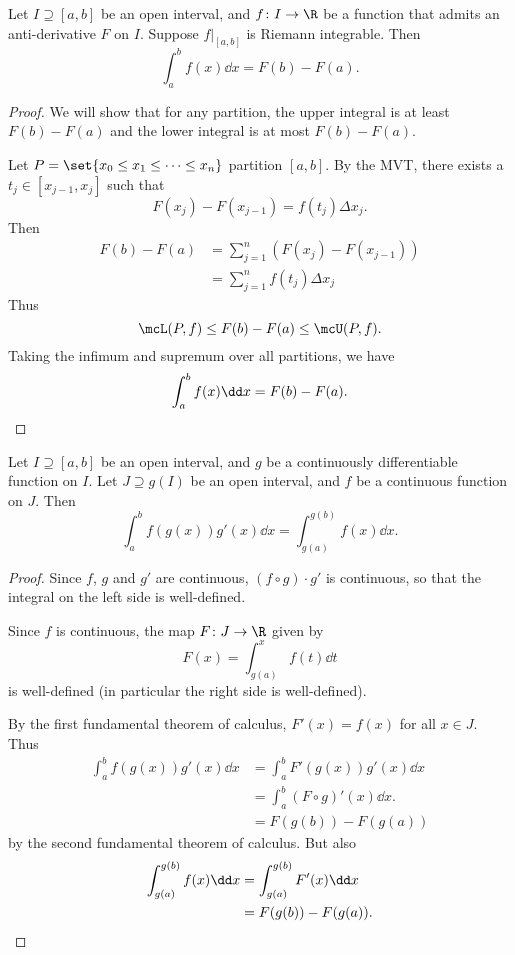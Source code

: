 \begin{exercise*}
    Let $I \supseteq [a, b]$ be an open interval, and
    $f\colon I \to \R$ be a function that admits an anti-derivative $F$
    on $I$.
    Suppose $f\vert_{[a, b]}$ is Riemann integrable.
    Then \[
        \int_a^b f(x) \dd x = F(b) - F(a).
    \]
\end{exercise*}
\begin{proof}
    We will show that for any partition, the upper integral is at least
    $F(b) - F(a)$ and the lower integral is at most $F(b) - F(a)$.

    Let $P = \set{x_0 \le x_1 \le \dots \le x_n}$ partition $[a, b]$.
    By the MVT, there exists a $t_j \in [x_{j-1}, x_j]$ such that \[
        F(x_j) - F(x_{j-1}) = f(t_j) \Delta x_j.
    \] Then \begin{align*}
        F(b) - F(a)
            &= \sum_{j=1}^n (F(x_j) - F(x_{j-1})) \\
            &= \sum_{j=1}^n f(t_j) \Delta x_j
    \end{align*}
    Thus \[
        \mcL(P, f) \le F(b) - F(a) \le \mcU(P, f).
    \] Taking the infimum and supremum over all partitions, we have \[
        \int_a^b f(x) \dd x = F(b) - F(a). \qedhere
    \]
\end{proof}

\begin{exercise}
    Let $I \supseteq [a, b]$ be an open interval, and $g$ be a continuously
    differentiable function on $I$.
    Let $J \supseteq g(I)$ be an open interval, and $f$ be a continuous
    function on $J$.
    Then \[
        \int_a^b f(g(x)) g'(x) \dd x = \int_{g(a)}^{g(b)} f(x) \dd x.
    \]
\end{exercise}
\begin{proof}
    Since $f$, $g$ and $g'$ are continuous, $(f \circ g) \cdot g'$ is
    continuous, so that the integral on the left side is well-defined.

    Since $f$ is continuous, the map $F\colon J \to \R$ given by \[
        F(x) = \int_{g(a)}^x f(t) \dd t
    \] is well-defined (in particular the right side is well-defined).

    By the first fundamental theorem of calculus, $F'(x) = f(x)$ for all
    $x \in J$.
    Thus \begin{align*}
        \int_a^b f(g(x)) g'(x) \dd x
            &= \int_a^b F'(g(x)) g'(x) \dd x \\
            &= \int_a^b (F \circ g)'(x) \dd x. \\
            &= F(g(b)) - F(g(a))
    \end{align*} by the second fundamental theorem of calculus.
    But also \begin{align*}
        \int_{g(a)}^{g(b)} f(x) \dd x
            &= \int_{g(a)}^{g(b)} F'(x) \dd x \\
            &= F(g(b)) - F(g(a)). \qedhere
    \end{align*}
\end{proof}

